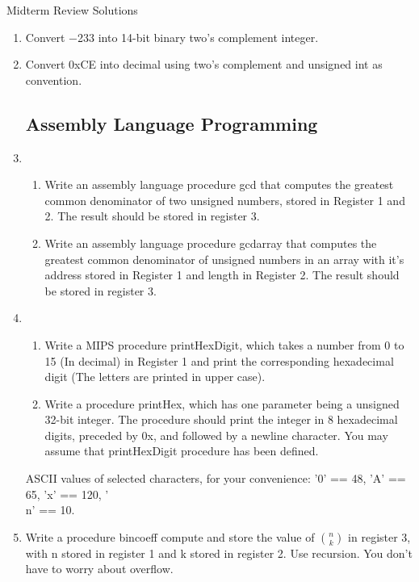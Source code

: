 \documentclass[12pt]{article}
\begin{document}
	
	Midterm Review Solutions
\begin{enumerate}
\subsection{ Binary Data }

	\item Convert −233 into 14-bit binary two’s complement integer.
	\item Convert 0xCE into decimal using two’s complement and unsigned int as convention.
	
	\subsection{Assembly Language Programming}
	\item 
	\begin{enumerate}
		\item Write an assembly language procedure gcd that computes the greatest common denominator
		of two unsigned numbers, stored in Register 1 and 2. The result should be stored in register 3.
		\item Write an assembly language procedure gcdarray that computes the greatest common denominator of unsigned numbers in an array with it’s address stored in Register 1 and length in
		Register 2. The result should be stored in register 3.

	\end{enumerate}
		\item 
	\begin{enumerate}
		\item Write a MIPS procedure printHexDigit, which takes a number from 0 to 15 (In decimal) in
		Register 1 and print the corresponding hexadecimal digit (The letters are printed in upper case).
		\item Write a procedure printHex, which has one parameter being a unsigned 32-bit integer. The
		procedure should print the integer in 8 hexadecimal digits, preceded by 0x, and followed by a
		newline character.
		You may assume that printHexDigit procedure has been defined.


	\end{enumerate}
    ASCII values of selected characters, for your convenience: ’0’ == 48, ’A’ == 65, ’x’ == 120,
    ’\\n’ == 10.
    \item Write a procedure bincoeff compute and store the value of     $\binom{n}{k}$
    in register 3, with n stored in register
    1 and k stored in register 2. Use recursion. You don’t have to worry about overflow.
    

\end{enumerate}
\end{document}
